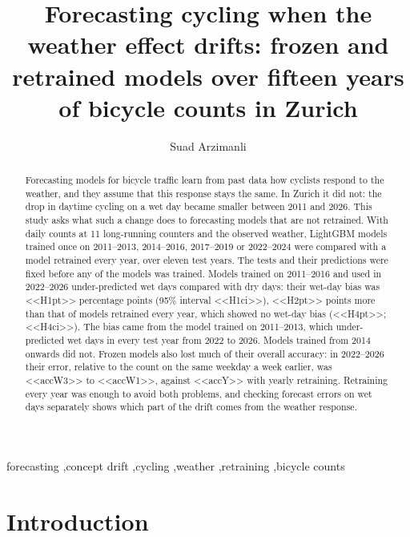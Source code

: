 \documentclass[preprint,12pt,authoryear]{elsarticle}
\begin{document}
\begin{frontmatter}

\title{Forecasting cycling when the weather effect drifts: frozen and retrained models over fifteen years of bicycle counts in Zurich}

\author{Suad Arzimanli}
\address{Faculty of Mathematics and Computer Science, University of \L{}\'od\'z, Poland}

\begin{abstract}
Forecasting models for bicycle traffic learn from past data how cyclists respond to the weather, and they assume that this response stays the same. In Zurich it did not: the drop in daytime cycling on a wet day became smaller between 2011 and 2026. This study asks what such a change does to forecasting models that are not retrained. With daily counts at 11 long-running counters and the observed weather, LightGBM models trained once on 2011--2013, 2014--2016, 2017--2019 or 2022--2024 were compared with a model retrained every year, over eleven test years. The tests and their predictions were fixed before any of the models was trained. Models trained on 2011--2016 and used in 2022--2026 under-predicted wet days compared with dry days: their wet-day bias was <<H1pt>> percentage points (95\% interval <<H1ci>>), <<H2pt>> points more than that of models retrained every year, which showed no wet-day bias (<<H4pt>>; <<H4ci>>). The bias came from the model trained on 2011--2013, which under-predicted wet days in every test year from 2022 to 2026. Models trained from 2014 onwards did not. Frozen models also lost much of their overall accuracy: in 2022--2026 their error, relative to the count on the same weekday a week earlier, was <<accW3>> to <<accW1>>, against <<accY>> with yearly retraining. Retraining every year was enough to avoid both problems, and checking forecast errors on wet days separately shows which part of the drift comes from the weather response.
\end{abstract}

\begin{keyword}
forecasting \sep concept drift \sep cycling \sep weather \sep retraining \sep bicycle counts
\end{keyword}

\end{frontmatter}

\section{Introduction}
\end{document}
